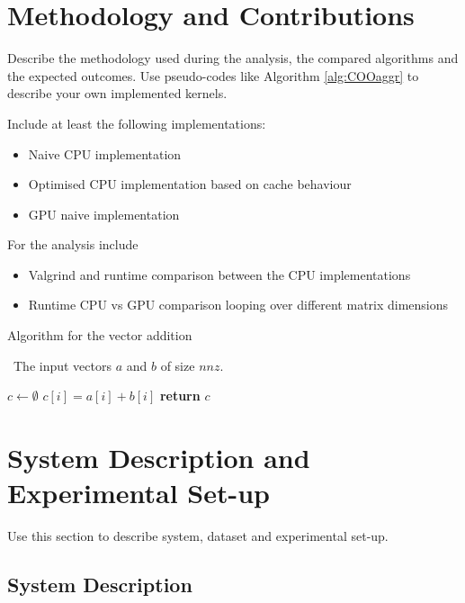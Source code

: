 \documentclass[conference]{IEEEtran}
\begin{document}
\section{Methodology and Contributions}\label{sec:methodology}

Describe the methodology used during the analysis, the compared algorithms and the expected outcomes. Use pseudo-codes like Algorithm \ref{alg:COOaggr} to describe your own implemented kernels.

\noindent Include at least the following implementations:
\begin{itemize}
    \item Naive CPU implementation
    \item Optimised CPU implementation based on cache behaviour
    \item GPU naive implementation
\end{itemize}

\noindent For the analysis include
\begin{itemize}
    \item Valgrind and runtime comparison between the CPU implementations 
    \item Runtime CPU vs GPU comparison looping over different matrix dimensions
\end{itemize}

\begin{algorithm}[h!]
\caption{Algorithm for the vector addition}
\algorithmicrequire~The input vectors $a$ and $b$ of size $nnz$.
\begin{algorithmic}[1]
\State $c \gets \emptyset$\label{partitioning}
\State $c[i] = a[i] + b[i]$\label{partitioning}
\EndFor
\State \textbf{return} $c$
\EndProcedure
\end{algorithmic}
\label{alg:COOaggr}
\end{algorithm}

\section{System Description and Experimental Set-up}

Use this section to describe system, dataset and experimental set-up.

\subsection{System Description}
\end{document}
